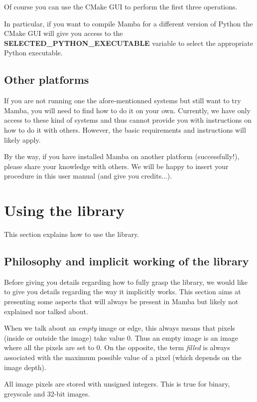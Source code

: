 \documentclass[a4paper,10pt,oneside]{article}
\begin{document}
Of course you can use the CMake GUI to perform the first three operations.

In particular, if you want to compile Mamba for a different version of Python
the CMake GUI will give you access to the \textbf{SELECTED\_PYTHON\_EXECUTABLE}
variable to select the appropriate Python executable.

\subsection{Other platforms}

If you are not running one the afore-mentionned systems but still want to try
Mamba, you will need to find how to do it on your own. Currently, we have only access to
these kind of systems and thus cannot provide you with instructions on how to do
it with others. However, the basic requirements and instructions will likely apply.

By the way, if you have installed Mamba on another platform (successfully!), please
share your knowledge with others. We will be happy to insert your procedure in this
user manual (and give you credits...).

\pagebreak

\section{Using the library}
\label{cha:using_library}

This section explains how to use the library.

\subsection{Philosophy and implicit working of the library}

Before giving you details regarding how to fully grasp the library, we would
like to give you details regarding the way it implicitly works. This section aims
at presenting some aspects that will always be present in Mamba but likely not 
explained nor talked about.

When we talk about an \textit{empty} image or edge, this always means that pixels 
(inside or outside the image) take value 0. Thus an empty
image is an image where all the pixels are set to 0. On the opposite, the term 
\textit{filled} is always associated with the maximum possible value of a pixel (which
depends on the image depth).

All image pixels are stored with unsigned integers. This is true for binary,
greyscale and 32-bit images.
\end{document}

